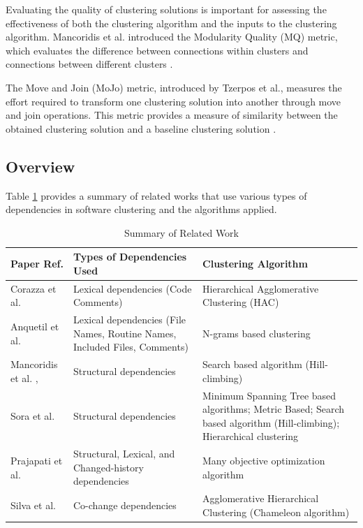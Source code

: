 \documentclass{ieeeaccess}
\begin{document}
Evaluating the quality of clustering solutions is important for assessing the effectiveness of both the clustering algorithm and the inputs to the clustering algorithm. Mancoridis et al. introduced the Modularity Quality (MQ) metric, which evaluates the difference between connections within clusters and connections between different clusters \cite{b10}.

The Move and Join (MoJo) metric, introduced by Tzerpos et al., measures the effort required to transform one clustering solution into another through move and join operations. This metric provides a measure of similarity between the obtained clustering solution and a baseline clustering solution \cite{b11}.

\subsection{Overview}

 Table \ref{tab:related_work} provides a summary of related works that use various types of dependencies in software clustering and the algorithms applied.

\begin{table}[h]
\caption{Summary of Related Work}
\label{tab:related_work}
\centering
\setlength{\tabcolsep}{3pt}
\begin{tabular}{|l|p{2cm}|p{3cm}|}
\hline
\textbf{Paper Ref.} & \textbf{Types of Dependencies Used} & \textbf{Clustering Algorithm} \\
\hline
Corazza et al. \cite {b13} & Lexical dependencies (Code Comments) & Hierarchical Agglomerative Clustering (HAC)  \\
\hline
Anquetil et al.  \cite {b14} & Lexical dependencies (File Names, Routine Names, Included Files, Comments) & N-grams based clustering   \\
\hline
Mancoridis et al. \cite {b10}, \cite{b101} & Structural dependencies & Search based algorithm (Hill-climbing)   \\
\hline
Sora et al. \cite{b12} & Structural dependencies  & Minimum Spanning Tree based algorithms; Metric Based; Search based algorithm (Hill-climbing); Hierarchical clustering\\
\hline
Prajapati et al. \cite{b18} & Structural, Lexical, and Changed-history dependencies & Many objective optimization algorithm\\
\hline
Silva et al. \cite{b16} & Co-change dependencies & Agglomerative Hierarchical Clustering (Chameleon algorithm)\\
\hline
\end{tabular}
\end{table}
\end{document}
